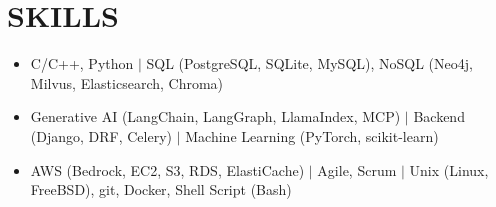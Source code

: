 \documentclass[letterpaper,11pt]{article}
\newcommand{\resumeItem}[1]{
  \item\small{#1}
}
\newcommand{\resumeItemListStart}{\begin{itemize}[label=$\vcenter{\hbox{\tiny$\bullet$}}$]}
\newcommand{\resumeItemListEnd}{\end{itemize}}
\begin{document}
\section{SKILLS}
\resumeItemListStart
\resumeItem{C/C++, Python $|$ SQL (PostgreSQL, SQLite, MySQL), NoSQL (Neo4j, Milvus, Elasticsearch, Chroma)}
\resumeItem{Generative AI (LangChain, LangGraph, LlamaIndex, MCP) $|$ Backend (Django, DRF, Celery) $|$ Machine Learning (PyTorch, scikit-learn)}
\resumeItem{AWS (Bedrock, EC2, S3, RDS, ElastiCache) $|$ Agile, Scrum $|$ Unix (Linux, FreeBSD), git, Docker, Shell Script (Bash)}
\resumeItemListEnd
\vspace{2pt}
\end{document}
